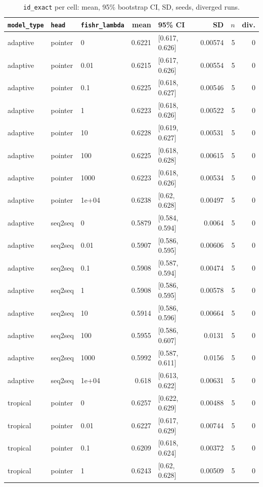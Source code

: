 \documentclass[10pt]{article}
\begin{document}
{\small
\begin{longtable}{lllrlrrr}
\caption{\texttt{id\_exact} per cell: mean, 95\% bootstrap CI, SD, seeds, diverged runs.}\label{tab:summary-id_exact}\\
\toprule
\texttt{model\_type} & \texttt{head} & \texttt{fishr\_lambda} & mean & 95\% CI & SD & $n$ & div.\\
\midrule
\endhead
adaptive & pointer & 0 & 0.6221 & [0.617, 0.626] & 0.00574 & 5 & 0\\
adaptive & pointer & 0.01 & 0.6215 & [0.617, 0.626] & 0.00554 & 5 & 0\\
adaptive & pointer & 0.1 & 0.6225 & [0.618, 0.627] & 0.00546 & 5 & 0\\
adaptive & pointer & 1 & 0.6223 & [0.618, 0.626] & 0.00522 & 5 & 0\\
adaptive & pointer & 10 & 0.6228 & [0.619, 0.627] & 0.00531 & 5 & 0\\
adaptive & pointer & 100 & 0.6225 & [0.618, 0.628] & 0.00615 & 5 & 0\\
adaptive & pointer & 1000 & 0.6223 & [0.618, 0.626] & 0.00534 & 5 & 0\\
adaptive & pointer & 1e+04 & 0.6238 & [0.62, 0.628] & 0.00497 & 5 & 0\\
adaptive & seq2seq & 0 & 0.5879 & [0.584, 0.594] & 0.0064 & 5 & 0\\
adaptive & seq2seq & 0.01 & 0.5907 & [0.586, 0.595] & 0.00606 & 5 & 0\\
adaptive & seq2seq & 0.1 & 0.5908 & [0.587, 0.594] & 0.00474 & 5 & 0\\
adaptive & seq2seq & 1 & 0.5908 & [0.586, 0.595] & 0.00578 & 5 & 0\\
adaptive & seq2seq & 10 & 0.5914 & [0.586, 0.596] & 0.00664 & 5 & 0\\
adaptive & seq2seq & 100 & 0.5955 & [0.586, 0.607] & 0.0131 & 5 & 0\\
adaptive & seq2seq & 1000 & 0.5992 & [0.587, 0.611] & 0.0156 & 5 & 0\\
adaptive & seq2seq & 1e+04 & 0.618 & [0.613, 0.622] & 0.00631 & 5 & 0\\
tropical & pointer & 0 & 0.6257 & [0.622, 0.629] & 0.00488 & 5 & 0\\
tropical & pointer & 0.01 & 0.6227 & [0.617, 0.629] & 0.00744 & 5 & 0\\
tropical & pointer & 0.1 & 0.6209 & [0.618, 0.624] & 0.00372 & 5 & 0\\
tropical & pointer & 1 & 0.6243 & [0.62, 0.628] & 0.00509 & 5 & 0\\

\end{longtable}}
\end{document}
